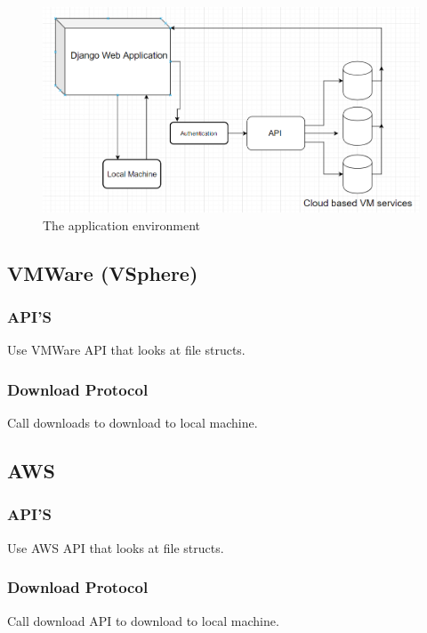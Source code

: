 \documentclass{article}
\begin{document}
    \begin{figure}[h]
    \includegraphics[scale=.7]{diagram}
        \caption{The application environment}
    \end{figure}

        \subsection{VMWare (VSphere)}

            \subsubsection{API'S}
            Use VMWare API that looks at file structs.


            \subsubsection{Download Protocol}
            Call downloads to download to local machine.

        \subsection{AWS}
            \subsubsection{API'S}
            Use AWS API that looks at file structs.

            \subsubsection{Download Protocol}
            Call download API to download to local machine.
\end{document}
